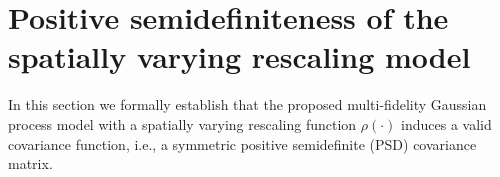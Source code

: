 \documentclass[12pt]{article}
\begin{document}





\section{Positive semidefiniteness of the spatially varying rescaling model}
\label{app:PSD_rho}

In this section we formally establish that the proposed multi-fidelity
Gaussian process model with a spatially varying rescaling function
$\rho(\cdot)$ induces a valid covariance function, i.e., a symmetric
positive semidefinite (PSD) covariance matrix.
\end{document}
